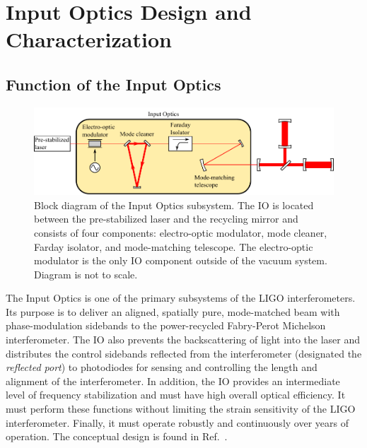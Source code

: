 \chapter{Input Optics Design and Characterization}

\section{Function of the Input Optics}
\label{sec:role}

\begin{figure}
\begin{centering}
\includegraphics{figures/InputOpticsBlock_thesis.pdf}
\caption[Block diagram of the Input Optics subsystem.]{Block diagram
  of the Input Optics subsystem. The IO is located between the
  pre-stabilized laser and the recycling mirror and consists of four
  components: electro-optic modulator, mode cleaner, Farday isolator,
  and mode-matching telescope. The electro-optic modulator is the only
  IO component outside of the vacuum system. Diagram is not to scale.}
\label{fig:IOblock}
\end{centering}
\end{figure}

The Input Optics is one of the primary subsystems of the LIGO
interferometers. Its purpose is to deliver an aligned, spatially
pure, mode-matched beam with phase-modulation sidebands to the
power-recycled Fabry-Perot Michelson interferometer. The IO also
prevents the backscattering of light into the laser and distributes
the control sidebands reflected from the interferometer (designated
the \emph{reflected port}) to photodiodes for sensing and controlling
the length and alignment of the interferometer. In addition, the IO
provides an intermediate level of frequency stabilization and must
have high overall optical efficiency. It must perform these functions
without limiting the strain sensitivity of the LIGO interferometer.
Finally, it must operate robustly and continuously over years of
operation. The conceptual design is found in
Ref.~\citep{Camp1996InputOutput}.

